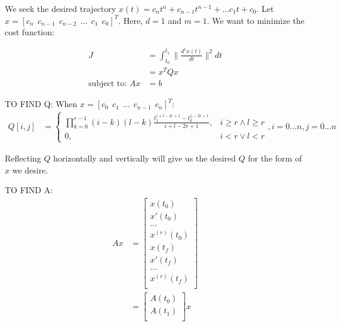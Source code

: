 \documentclass[11pt]{article}
\begin{document}
\mbox{} \newline
We seek the desired trajectory $x(t) = c_n t^n + c_{n-1} t^{n-1} + ... c_1 t + c_0$. Let $x = [c_n \ \ c_{n-1} \ \ c_{n-2} \ \ ... \ \ c_1 \ \ c_0]^T$. Here, $d = 1$ and $m = 1$. We want to minimize the cost function:

\begin{align*}
J &= \int_{t_0}^{t_1} \|  \frac{d^{r} x(t) }{dt} \|^2 dt  \\
&= x^T Q x \\
\text{subject to: } Ax &=b
\end{align*}



\mbox{} \newline
\mbox{} \newline
TO FIND Q: \newline
When $x = [c_0 \ \ c_1 \ \ ... \ \ c_{n-1} \ \ c_n]^T$:
\begin{align}
\label{eqn: Q} Q[i, j] &= 
\begin{cases}
    \prod_{k = 0}^{r-1} {(i-k)(l-k)} \frac{ t_1^{i+l-2r+1} - t_0^{i_l-2r+1} }{i+l-2r+1}, & i \ge r \land l \ge r \\
    0, & i < r \lor l < r 
\end{cases}, i = 0...n, j = 0...n
\end{align}

Reflecting $Q$ horizontally and vertically will give us the desired $Q$ for the form of $x$ we desire. 



\mbox{} \newline
\mbox{} \newline
TO FIND A: \newline
\begin{align*}
Ax &= 
\begin{bmatrix}
  x(t_0) \\
  x'(t_0) \\
  ... \\
  x^{(r)}(t_0) \\
    x(t_f) \\
  x'(t_f) \\
  ... \\
  x^{(r)}(t_f) \\
 \end{bmatrix} \\
 &= 
 \begin{bmatrix}
  A(t_0) \\
  A(t_1) \\
 \end{bmatrix} 
 x
\end{align*}
\end{document}
